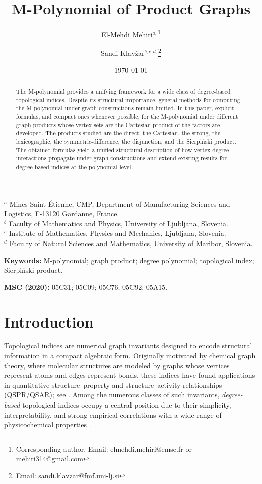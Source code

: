 \documentclass[letterpaper,12pt]{article}
\author{
El-Mehdi Mehiri$^{a,}$\footnote{Corresponding author. Email: elmehdi.mehiri@emse.fr or  mehiri314@gmail.com}  \and Sandi Klav{\v{z}}ar$^{b,c,d,}$\footnote{Email: sandi.klavzar@fmf.uni-lj.si}
}
\title{\textbf{M-Polynomial of Product Graphs}}
\date{\today}
\begin{document}
\maketitle


\begin{center}
{\small
$^{a}$ Mines Saint-Étienne, CMP, Department of Manufacturing Sciences and Logistics, 
F-13120 Gardanne, France. \\[4pt]
$^{b}$ Faculty of Mathematics and Physics, University of Ljubljana, Slovenia.\\[4pt]
$^{c}$ Institute of Mathematics, Physics and Mechanics, Ljubljana, Slovenia.\\[4pt]
$^{d}$ Faculty of Natural Sciences and Mathematics, University of Maribor, Slovenia.
}
\end{center}

 \begin{abstract}
\noindent 
The M-polynomial provides a unifying framework for a wide class of degree-based topological indices. Despite its structural importance, general methods for computing the M-polynomial under graph constructions remain limited.  In this paper, explicit formulas, and compact ones whenever possible, for the M-polynomial under different graph products whose vertex sets are the Cartesian product of the factors are developed. The products studied are the direct, the Cartesian, the strong, the lexicographic, the symmetric-difference, the disjunction, and the Sierpi\'{n}ski product. The obtained formulas yield a unified structural description of how vertex-degree interactions propagate under graph constructions and extend existing results for degree-based indices at the polynomial level.
\end{abstract}

\textbf{Keywords:} M-polynomial; graph product; degree polynomial; topological index; Sierpi\'{n}ski product.

\textbf{MSC (2020):} 05C31; 05C09; 05C76; 05C92; 05A15.

\section{Introduction}\label{sec:introduction}

Topological indices are numerical graph invariants designed to encode structural
information in a compact algebraic form.
Originally motivated by chemical graph theory, where molecular structures are
modeled by graphs whose vertices represent atoms and edges represent bonds,
these indices have found applications in quantitative structure--property and 
structure--activity relationships (QSPR/QSAR); see 
\cite{gutman2012mathematical,trinajstic2018chemical}.
Among the numerous classes of such invariants, \emph{degree-based} topological indices occupy
a central position due to their simplicity, interpretability, and strong empirical
correlations with a wide range of physicochemical properties \cite{Dearden2017}.
\end{document}
